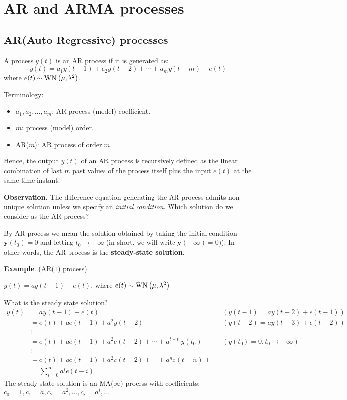 \section{AR and ARMA processes}

\subsection{AR(Auto Regressive) processes}
A process $y(t)$ is an AR process if it is generated as:
\[
	\boxed{y(t)=a_{1} y(t-1)+a_{2} y(t-2)+\cdots+a_{m} y(t-m)+e(t)}
\]
where $e(t) \sim \operatorname{WN}\left(\mu, \lambda^{2}\right)$.

Terminology:
\begin{itemize}
	\item $a_{1}, a_{2}, \ldots, a_{m}$: AR process (model) coefficient.
	\item $m$: process (model) order.
	\item AR($m$): AR process of order $m$.
\end{itemize}
 
Hence, the output $y(t)$ of an AR process is recursively defined as the linear combination of last $m$ past values of the process itself plus the input $e(t)$ at the same time instant.

\textbf{Observation.}
The difference equation generating the AR process admits non-unique solution unless we specify an \emph{initial condition}. Which solution do we consider as the AR process?

By AR process we mean the solution obtained by taking the initial condition $\boxed{\mathbf{y}(t_{0})=0}$ and letting $t_{0} \to -\infty$ (in short, we will write $\mathbf{y}(-\infty)=0$)). In other words, the AR process is the \textbf{steady-state solution}.

\textbf{Example.} (AR($1$) process)

$y(t)=a y(t-1)+e(t)$, where $e(t) \sim \operatorname{WN}\left(\mu, \lambda^{2}\right)$

What is the steady state solution?
\begin{align*}
	y(t) & =a y(t-1)+e(t) & (y(t-1)=a y(t-2)+e(t-1)) \\
	& =e(t)+a e(t-1)+a^{2} y(t-2) & (y(t-2)=a y(t-3)+e(t-2)) \\
	& \vdots & \\
	& =e(t)+a e(t-1)+a^{2} e(t-2)+\cdots+a^{t-t_{0}} y\left(t_{0}\right) & (y\left(t_{0}\right)=0,t_{0} \to-\infty) \\
	& \vdots & \\
	& =e(t)+a e(t-1)+a^{2} e(t-2)+\cdots+a^{n} e(t-n)+\cdots\\
	&=\sum_{i=0}^{\infty} a^{i} e(t-i)
\end{align*}
The steady state solution is an MA($\infty$) process with coefficients: $c_{0}=1, c_{1}=a, c_{2}=a^{2}, \ldots, c_{i}=a^{i}, \ldots$

